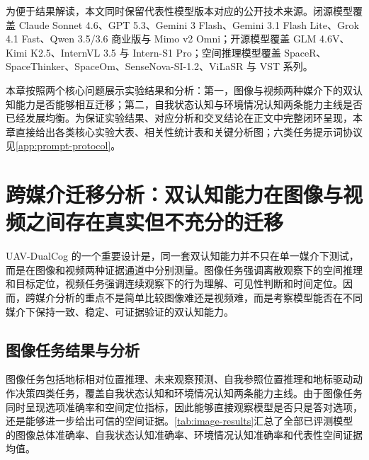 为便于结果解读，本文同时保留代表性模型版本对应的公开技术来源。闭源模型覆盖 Claude Sonnet 4.6、GPT 5.3、Gemini 3 Flash、Gemini 3.1 Flash Lite、Grok 4.1 Fast、Qwen 3.5/3.6 商业版与 Mimo v2 Omni\cite{anthropic2026claude46,openai2026gpt53,deepmind2025gemini3flash,deepmind2026gemini31flashlite,xai2025grok41,qwen3.5,qwen36plus,mimo_v2_omni}；开源模型覆盖 GLM 4.6V、Kimi K2.5、InternVL 3.5 与 Intern-S1 Pro\cite{vteam2025glm45vglm41vthinkingversatilemultimodal,team2026kimi,wang2025internvl3_5,zou2026interns1proscientificmultimodalfoundation}；空间推理模型覆盖 SpaceR、SpaceThinker、SpaceOm、SenseNova-SI-1.2、ViLaSR 与 VST 系列\cite{ouyang2025spacer,SpaceThinker2025,SpaceOm2025,sensenova-si,wu2025reinforcing,yang2025visual}。

本章按照两个核心问题展示实验结果和分析：第一，图像与视频两种媒介下的双认知能力是否能够相互迁移；第二，自我状态认知与环境情况认知两条能力主线是否已经发展均衡。为保证实验结果、对应分析和交叉结论在正文中完整闭环呈现，本章直接给出各类核心实验大表、相关性统计表和关键分析图；六类任务提示词协议见\autoref{app:prompt-protocol}。

\newcommand{\resultgroup}[2]{\midrule\multicolumn{#1}{c}{#2} \\ \midrule}

\section{跨媒介迁移分析：双认知能力在图像与视频之间存在真实但不充分的迁移}

UAV-DualCog 的一个重要设计是，同一套双认知能力并不只在单一媒介下测试，而是在图像和视频两种证据通道中分别测量。图像任务强调离散观察下的空间推理和目标定位，视频任务强调连续观察下的行为理解、可见性判断和时间定位。因而，跨媒介分析的重点不是简单比较图像难还是视频难，而是考察模型能否在不同媒介下保持一致、稳定、可证据验证的双认知能力。

\subsection{图像任务结果与分析}

图像任务包括地标相对位置推理、未来观察预测、自我参照位置推理和地标驱动动作决策四类任务，覆盖自我状态认知和环境情况认知两条能力主线。由于图像任务同时呈现选项准确率和空间定位指标，因此能够直接观察模型是否只是答对选项，还是能够进一步给出可信的空间证据。\autoref{tab:image-results}汇总了全部已评测模型的图像总体准确率、自我状态认知准确率、环境情况认知准确率和代表性空间证据均值。

